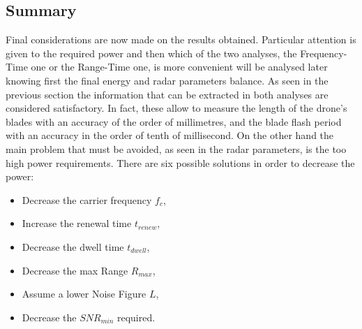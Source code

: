 \subsection{Summary}
Final considerations are now made on the results obtained. Particular attention is given to the required power and then which of the two analyses, the Frequency-Time one or the Range-Time one, is more convenient will be analysed later knowing first the final energy and radar parameters balance. As seen in the previous section the information that can be extracted in both analyses are considered satisfactory. In fact, these allow to measure the length of the drone's blades with an accuracy of the order of millimetres, and the blade flash period with an accuracy in the order of tenth of millisecond. On the other hand the main problem that must be avoided, as seen in the radar parameters, is the too high power requirements. There are six possible solutions in order to decrease the power:

\begin{itemize}

    \item Decrease the carrier frequency $f_{c}$,

    \item Increase the renewal time $t_{renew}$,
    
    \item Decrease the dwell time $t_{dwell}$,
    
    \item Decrease the max Range $R_{max}$,
    
    \item Assume a lower Noise Figure $L$,
         
    \item Decrease the $SNR_{min}$ required.

\end{itemize}

